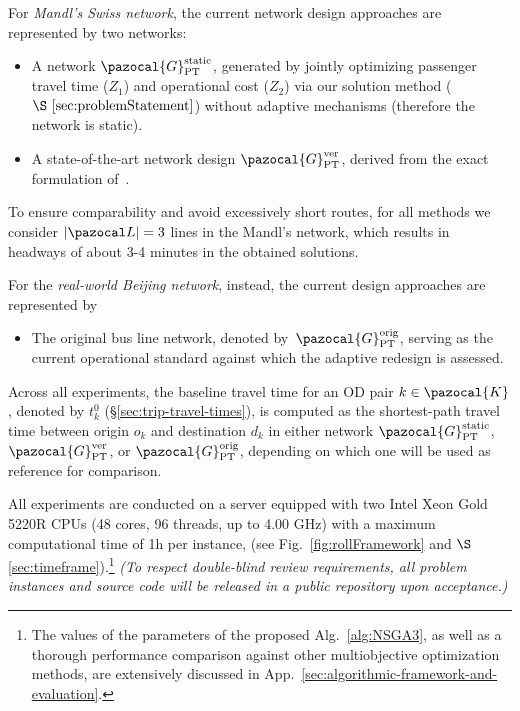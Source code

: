 \documentclass[a4paper,fleqn]{cas-sc}
\begin{document}
For \emph{Mandl’s Swiss network}, the current network design approaches are represented by two networks:
\begin{itemize}
\item A network $\pazocal{G}_{\text{PT}}^{\text{static}}$, generated by jointly optimizing passenger travel time ($Z_1$) and operational cost ($Z_2$) via our solution method ($\S~\ref{sec:problemStatement}$) without adaptive mechanisms (therefore the network is static).
\item A state-of-the-art network design $\pazocal{G}_{\text{PT}}^{\text{ver}}$, derived from the exact formulation of~\cite{vermeir2021exact}.
\end{itemize}
To ensure comparability and avoid excessively short routes, for all methods we consider $|\pazocal L|=3$ lines in the Mandl's network, which results in headways of about 3-4 minutes in the obtained solutions.

For the \emph{real-world Beijing network}, instead, the current design approaches are represented by
\begin{itemize}
\item The original bus line network, denoted by~$\pazocal{G}_{\text{PT}}^{\text{orig}}$, serving as the current operational standard against which the adaptive redesign is assessed.
\end{itemize}
%
Across all experiments, the baseline travel time for an OD pair $k \in \pazocal{K}$, denoted by $t_k^0$ (\S{}\ref{sec:trip-travel-times}), is computed as the shortest-path travel time between origin $o_k$ and destination $d_k$ in either network $\pazocal{G}_{\text{PT}}^{\text{static}}$, $\pazocal{G}_{\text{PT}}^{\text{ver}}$, or $\pazocal{G}_{\text{PT}}^{\text{orig}}$, depending on which one will be used as reference for comparison.


All experiments are conducted on a server equipped with two Intel Xeon Gold 5220R CPUs (48 cores, 96 threads, up to 4.00 GHz) with a maximum computational time of 1h per instance,  (see Fig.~\ref{fig:rollFramework} and $\S$\ref{sec:timeframe}).\footnote{The values of the parameters of the proposed Alg.~\ref{alg:NSGA3}, as well as a thorough performance comparison against other multiobjective optimization methods, are extensively discussed in App.~\ref{sec:algorithmic-framework-and-evaluation}.}
%
\textit{(To respect double-blind review requirements, all problem instances and source code will be released in a public repository upon acceptance.)}
\end{document}
